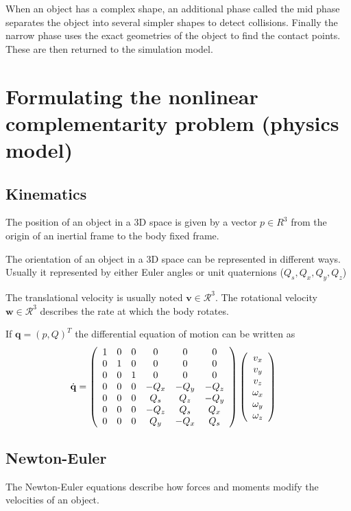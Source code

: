 When an object has a complex shape, an additional phase called the mid phase separates the object into several simpler shapes to detect collisions. Finally the narrow phase uses the exact geometries of the object to find the contact points. These are then returned to the simulation model.

\section{Formulating the nonlinear complementarity problem (physics model)}
\subsection{Kinematics}
The position of an object in a 3D space is given by a vector $p \in R^3$ from the origin of an inertial frame to the body fixed frame.

The orientation of an object in a 3D space can be represented in different ways. Usually it represented by either Euler angles or unit quaternions ($Q_s, Q_x, Q_y, Q_z$)

The translational velocity is usually noted $\mathbf{v} \in \mathcal{R}^3$. The rotational velocity $\mathbf{w} \in \mathcal{R}^3$ describes the rate at which the body rotates.

If $\mathbf{q} = (p, Q)^T$ the differential equation of motion can be written as 
\begin{align*}
\dot{\mathbf{q}} &= \left(\begin{array}{c c c c c c}
1 & 0 & 0 & 0 & 0 & 0\\
0 & 1 & 0 & 0 & 0 & 0\\
0 & 0 & 1 & 0 & 0 & 0\\
0 & 0 & 0 & -Q_x & -Q_y & -Q_z\\
0 & 0 & 0 & Q_s & Q_z & -Q_y\\
0 & 0 & 0 & -Q_z & Q_s & Q_x\\
0 & 0 & 0 & Q_y & -Q_x & Q_s
\end{array}\right)
\left(\begin{array}{c}
v_x\\
v_y\\
v_z\\
\omega_x\\
\omega_y\\
\omega_z
\end{array}\right)
\end{align*}

\subsection{Newton-Euler}
The Newton-Euler equations describe how forces and moments modify the velocities of an object.

